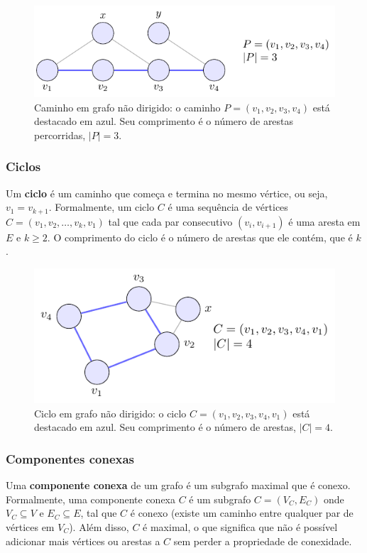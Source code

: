 \begin{figure}[H]
	\centering
	\includegraphics[width=0.9\linewidth]{figures/fig_caminho.pdf}

	\caption{Caminho em grafo não dirigido: o caminho $P=(v_1,v_2,v_3,v_4)$ está destacado em azul. Seu comprimento é o número de arestas percorridas, $|P|=3$.}
	\label{fig:caminho}\end{figure}


\subsubsection{Ciclos}
Um \textbf{ciclo} é um caminho que começa e termina no mesmo vértice, ou seja, \(v_1 = v_{k+1}\). Formalmente, um ciclo \(C\) é uma sequência de vértices \(C = (v_1, v_2, \ldots, v_k, v_1)\) tal que cada par consecutivo \((v_i, v_{i+1})\) é uma aresta em \(E\) e \(k \geq 2\). O comprimento do ciclo é o número de arestas que ele contém, que é \(k\).


\begin{figure}[H]
	\centering
	\includegraphics[width=0.9\linewidth]{figures/fig_ciclo.pdf}

	\caption{Ciclo em grafo não dirigido: o ciclo $C=(v_1,v_2,v_3,v_4,v_1)$ está destacado em azul. Seu comprimento é o número de arestas, $|C|=4$.}
	\label{fig:ciclo}\end{figure}


\subsubsection{Componentes conexas}
Uma \textbf{componente conexa} de um grafo é um subgrafo maximal que é conexo. Formalmente, uma componente conexa \(C\) é um subgrafo \(C = (V_C, E_C)\) onde \(V_C \subseteq V\) e \(E_C \subseteq E\), tal que \(C\) é conexo (existe um caminho entre qualquer par de vértices em \(V_C\)). Além disso, \(C\) é maximal, o que significa que não é possível adicionar mais vértices ou arestas a \(C\) sem perder a propriedade de conexidade.


